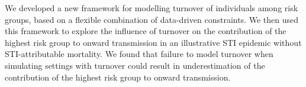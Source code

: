 We developed a new framework for modelling turnover of individuals among risk groups,
based on a flexible combination of data-driven constraints.
We then used this framework to explore the influence of turnover on
the contribution of the highest risk group to onward transmission in an
illustrative STI epidemic without STI-attributable mortality.
We found that failure to model turnover when simulating settings with turnover
could result in underestimation of
the contribution of the highest risk group to onward transmission.
